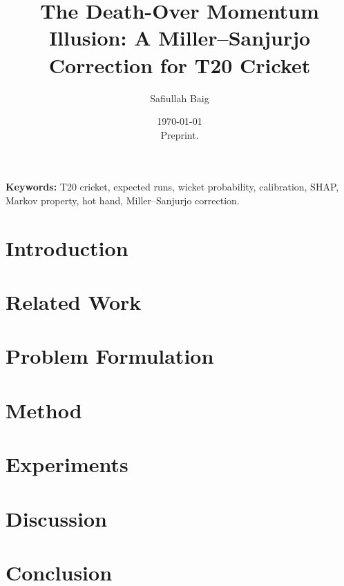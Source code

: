 \documentclass[11pt]{article}
\begin{document}
\title{\textbf{The Death-Over Momentum Illusion: A Miller--Sanjurjo Correction
for T20 Cricket}}

\author{
  Safiullah Baig
}

\date{
  \today \\[0.5em]
  \small Preprint.
}

\maketitle

\begin{abstract}
  
\end{abstract}

\textbf{Keywords:} T20 cricket, expected runs, wicket probability, calibration,
SHAP, Markov property, hot hand, Miller--Sanjurjo correction.


\section{Introduction}
\label{sec:intro}


\section{Related Work}
\label{sec:related}


\section{Problem Formulation}
\label{sec:background}


\section{Method}
\label{sec:method}


\section{Experiments}
\label{sec:experiments}


\section{Discussion}
\label{sec:discussion}


\section{Conclusion}
\label{sec:conclusion}




\end{document}
